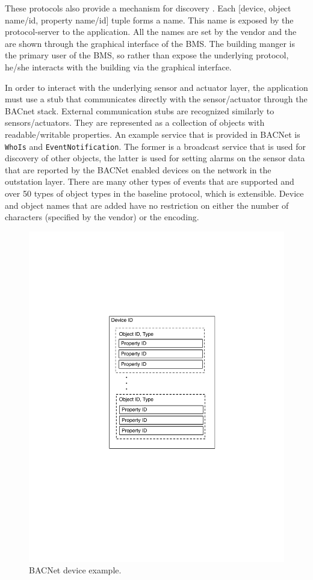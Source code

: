These protocols also provide a mechanism for discovery .  Each [device, object name/id, property name/id] tuple forms a name.
This name is exposed by the protocol-server to the application.  All the names are set by the vendor and the are shown through the graphical interface
of the BMS.  
The building manger is the primary user of the BMS,
so rather than expose the underlying protocol, he/she interacts with the building via the graphical interface.

In order to interact with the underlying sensor and actuator layer, the application must use a stub that communicates directly with the 
sensor/actuator through the BACnet stack.  External communication stubs are recognized similarly to sensors/actuators.  They are represented 
as a collection of 
objects with readable/writable properties.  An example service that is provided in BACNet is  \texttt{WhoIs} and \texttt{EventNotification}.
The former is a broadcast service that is used for discovery of other objects, the latter is used for setting alarms on the sensor data that
are reported by the BACNet enabled devices on the network in the outstation layer.  There are many other types of events that are supported 
and over 50 types of object types in the baseline protocol, which is extensible.  Device and object names that are added have no restriction
on either the number of characters (specified by the vendor) or the encoding.


\begin{figure}[t!] %
\centering
\includegraphics[width=0.25\columnwidth]{figs/bacnet_device}
\caption{BACNet device example.}
\label{fig:bacnet_device}
\end{figure}